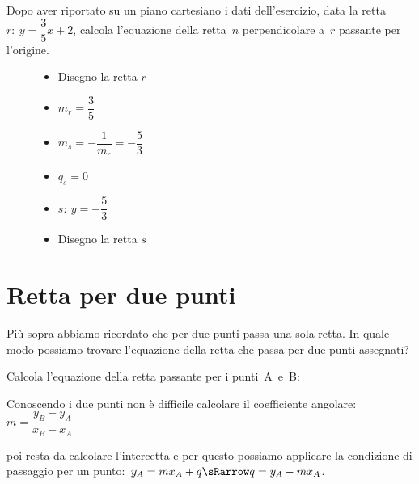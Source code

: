  \begin{esempio}
Dopo aver riportato su un piano cartesiano i dati dell'esercizio,
data la retta~\(r:~y = \dfrac{3}{5} x +2\), calcola l'equazione della 
retta~\(n\) perpendicolare a~\(r\) passante per l'origine.

\begin{inaccessibleblock}
 \begin{figure}[h]
\centering \hspace{-5mm}
 \begin{minipage}[]{.40\textwidth}
  \begin{itemize}
  \item Disegno la retta \(r\)
  \item \(m_r = \dfrac{3}{5}\)
  \item \(m_s = - \dfrac{1}{m_r} = -\dfrac{5}{3}\)
  \item \(q_s = 0\)
  \item \(s:~ y= -\dfrac{5}{3}\)
  \item Disegno la retta \(s\)
  \end{itemize}
 \end{minipage}
 \begin{minipage}[]{.60\textwidth}
   \centering \esempioperp
 \end{minipage}
\label{fig:esempioperp}
\end{figure}
\end{inaccessibleblock}
 \end{esempio}


\section{Retta per due punti}
\label{sec:retta_rettaperduepunti}

Più sopra abbiamo ricordato che per due punti passa una sola retta. 
In quale modo possiamo trovare l'equazione della retta che passa per due 
punti assegnati?

\begin{procedura}
 Calcola l'equazione della retta passante per i punti~A~e~B:
 \begin{enumeratea}
  \item Conoscendo i due punti non è difficile calcolare il coefficiente 
   angolare:~\(m = \dfrac{y_B - y_A}{x_B - x_A}\)
  \item poi resta da calcolare l'intercetta e per questo possiamo applicare 
   la condizione di passaggio per un 
   punto:~\(y_A = m x_A + q \sRarrow q = y_A - m x_A\).
 \end{enumeratea}
\end{procedura}


